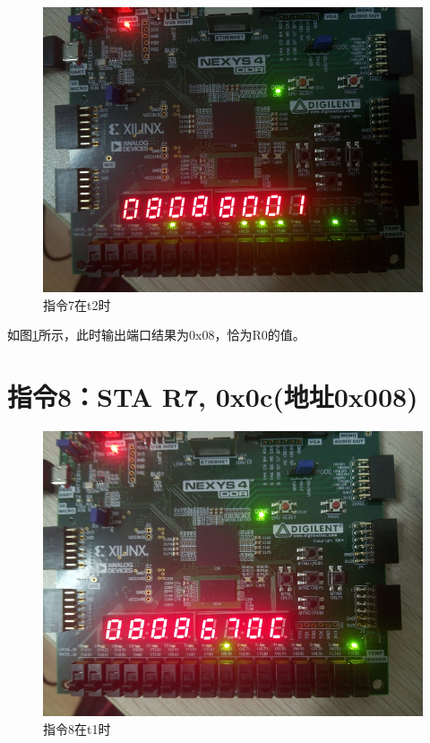 \documentclass[forprint]{WHUBachelor}
\begin{document}
\begin{figure}[H]
  \centering
  \includegraphics[width=5in]{figures/download/62.jpg}
  \caption{指令7在t2时}
  \label{fig:down:62}
\end{figure}

如图\ref{fig:down:62}所示，此时输出端口结果为0x08，恰为R0的值。

\section{指令8：STA R7, 0x0c(地址0x008)}

\begin{figure}[H]
  \centering
  \includegraphics[width=5in]{figures/download/70.jpg}
  \caption{指令8在t1时}
  \label{fig:down:70}
\end{figure}
\end{document}
